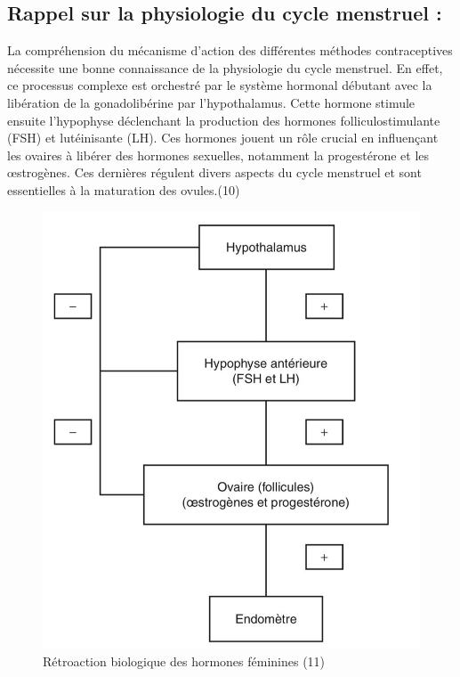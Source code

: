 \subsection{Rappel sur la physiologie du cycle menstruel : }

La compréhension du mécanisme d’action des différentes méthodes contraceptives nécessite une bonne connaissance de la physiologie du cycle menstruel. En effet, ce processus complexe est orchestré par le système hormonal débutant avec la libération de la gonadolibérine par l’hypothalamus. Cette hormone stimule ensuite l’hypophyse déclenchant la production des hormones folliculostimulante (FSH) et lutéinisante (LH). Ces hormones jouent un rôle crucial en influençant les ovaires à libérer des hormones sexuelles, notamment la progestérone et les œstrogènes. Ces dernières régulent divers aspects du cycle menstruel et sont essentielles à la maturation des ovules.(10) 

\begin{figure}[H]
  \centering
  \includegraphics{Images/fig_3.jpg}
  \caption{Rétroaction biologique des hormones féminines (11)}
\end{figure}


